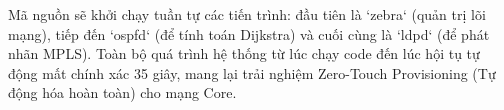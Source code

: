 Mã nguồn sẽ khởi chạy tuần tự các tiến trình: đầu tiên là `zebra` (quản trị lõi mạng), tiếp đến `ospfd` (để tính toán Dijkstra) và cuối cùng là `ldpd` (để phát nhãn MPLS). Toàn bộ quá trình hệ thống từ lúc chạy code đến lúc hội tụ tự động mất chính xác 35 giây, mang lại trải nghiệm Zero-Touch Provisioning (Tự động hóa hoàn toàn) cho mạng Core.
